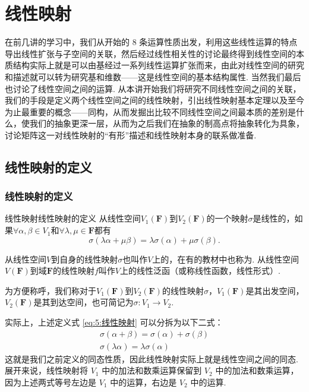 \chapter{线性映射}

在前几讲的学习中，我们从开始的 8 条运算性质出发，利用这些线性运算的特点导出线性扩张与子空间的关联，然后经过线性相关性的讨论最终得到线性空间的本质结构实际上就是可以由基经过一系列线性运算扩张而来，由此对线性空间的研究和描述就可以转为研究基和维数——这是线性空间的基本结构属性. 当然我们最后也讨论了线性空间之间的运算. 从本讲开始我们将研究不同线性空间之间的关联，我们的手段是定义两个线性空间之间的线性映射，引出线性映射基本定理以及至今为止最重要的概念——同构，从而发掘出比较不同线性空间之间最本质的差别是什么，使我们的抽象更深一层，从而为之后我们在抽象的制高点将抽象转化为具象，讨论矩阵这一对线性映射的``有形''描述和线性映射本身的联系做准备.

\section{线性映射的定义}

\subsection{线性映射的定义}

\begin{definition}{线性映射}{线性映射的定义} 
    从线性空间$V_1(\mathbf{F})$到$V_2(\mathbf{F})$的一个映射$\sigma$是线性的，如果$\forall \alpha,\beta \in V_1$和$\forall \lambda,\mu \in \mathbf{F}$都有
    \begin{equation}\label{eq:5:线性映射}
        \sigma(\lambda\alpha+\mu\beta)=\lambda\sigma(\alpha)+\mu\sigma(\beta).
    \end{equation}

    从线性空间$V$到自身的线性映射$\sigma$也叫作$V$上的，在有的教材中也称为. 从线性空间$V(\mathbf{F})$到域$\mathbf{F}$的线性映射$f$叫作$V$上的线性泛函（或称线性函数，线性形式）.

    为方便称呼，我们称对于$V_1(\mathbf{F})$到$V_2(\mathbf{F})$的线性映射$\sigma$，$V_1(\mathbf{F})$是其出发空间，$V_2(\mathbf{F})$是其到达空间，也可简记为$\sigma: V_1\to V_2$.
\end{definition}
实际上，上述定义式 \ref*{eq:5:线性映射} 可以分拆为以下二式：
\begin{gather}
    \tag{加性} \sigma(\alpha+\beta)=\sigma(\alpha)+\sigma(\beta) \\
    \tag{齐次性} \sigma(\lambda\alpha)=\lambda\sigma(\alpha)
\end{gather}
这就是我们之前定义的同态性质，因此线性映射实际上就是线性空间之间的同态. 展开来说，线性映射将 $V_1$ 中的加法和数乘运算保留到 $V_2$ 中的加法和数乘运算，因为上述两式等号左边是 $V_1$ 中的运算，右边是 $V_2$ 中的运算.

